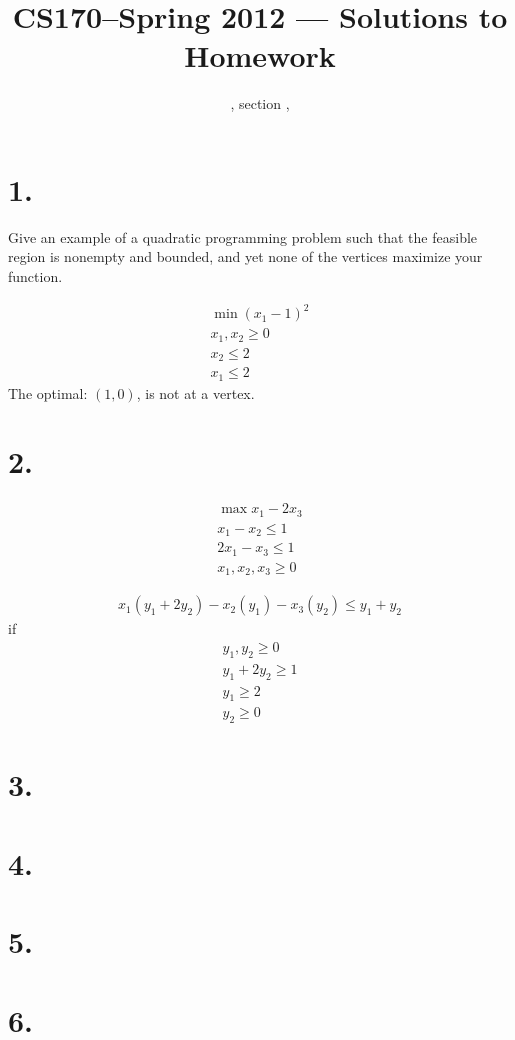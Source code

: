 \documentclass[11pt]{article}
\title{CS170--Spring 2012 --- Solutions to Homework \HW}
\author{\Name, section \Sec, \texttt{\Login}}
\begin{document}
\maketitle

\section*{1.}
Give an example of a quadratic programming problem such that the feasible
region is nonempty and bounded, and yet none of the vertices maximize your
function. 

\begin{eqnarray*}
\min (x_1-1)^2 \\
x_1, x_2 \ge 0\\
x_2 \le 2\\
x_1 \le 2
\end{eqnarray*}
The optimal: $(1, 0)$, is not at a vertex. 


\newpage
\section*{2.}
\begin{eqnarray*}
\max x_1 - 2x_3\\
x_1 - x_2 \le 1\\
2x_1 - x_3 \le 1\\
x_1, x_2, x_3 \ge 0
\end{eqnarray*}

\begin{eqnarray*}
x_1(y_1 + 2y_2) - x_2(y_1) - x_3(y_2) \le y_1 + y_2
\end{eqnarray*}
if
\begin{eqnarray*}
y_1, y_2 \ge 0\\
y_1 + 2y_2 \ge 1\\
y_1 \ge 2\\
y_2 \ge 0
\end{eqnarray*}

\newpage
\section*{3.}
\newpage
\section*{4.}
\newpage
\section*{5.}
\newpage
\section*{6.}
\end{document}
